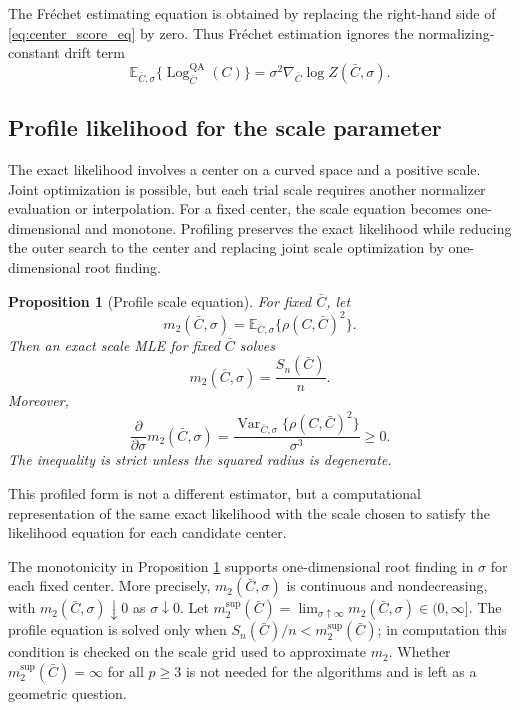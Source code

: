 \documentclass[
  12pt]{article}
\newcommand{\Frechet}{Fr\'{e}chet\xspace}
\newcommand{\Log}{\operatorname{Log}}
\newcommand{\E}{\mathbb E}
\newcommand{\Var}{\operatorname{Var}}
\newcommand{\QA}{\mathrm{QA}}
\newtheorem{proposition}{Proposition}
\begin{document}
The \Frechet estimating equation is obtained by replacing the right-hand side of \eqref{eq:center_score_eq} by zero. Thus Fr\'echet estimation ignores the normalizing-constant drift term
\[
\E_{\bar C,\sigma}\{\Log^{\QA}_{\bar C}(C)\}=\sigma^2\nabla_{\bar C}\log Z(\bar C,\sigma).
\]



\subsection{Profile likelihood for the scale parameter}

The exact likelihood involves a center on a curved space and a positive scale. Joint optimization is possible, but each trial scale requires another normalizer evaluation or interpolation. For a fixed center, the scale equation becomes one-dimensional and monotone. Profiling preserves the exact likelihood while reducing the outer search to the center and replacing joint scale optimization by one-dimensional root finding.

\begin{proposition}[Profile scale equation]\label{prop:profile_scale}
For fixed $\bar C$, let
\[
m_2(\bar C,\sigma)=\E_{\bar C,\sigma}\{\rho(C,\bar C)^2\}.
\]
Then an exact scale MLE for fixed $\bar C$ solves
\[
m_2(\bar C,\sigma)=\frac{S_n(\bar C)}{n}.
\]
Moreover,
\begin{equation}\label{eq:m2_monotone}
\frac{\partial}{\partial\sigma}m_2(\bar C,\sigma)=\frac{\Var_{\bar C,\sigma}\{\rho(C,\bar C)^2\}}{\sigma^3}\ge0.
\end{equation}
The inequality is strict unless the squared radius is degenerate.
\end{proposition}

This profiled form is not a different estimator, but a computational representation of the same exact likelihood with the scale chosen to satisfy the likelihood equation for each candidate center.

The monotonicity in Proposition \ref{prop:profile_scale} supports one-dimensional root finding in $\sigma$ for each fixed center. More precisely, $m_2(\bar C,\sigma)$ is continuous and nondecreasing, with $m_2(\bar C,\sigma)\downarrow0$ as $\sigma\downarrow0$. Let $m_2^{\sup}(\bar C)=\lim_{\sigma\uparrow\infty}m_2(\bar C,\sigma)\in(0,\infty]$. The profile equation is solved only when $S_n(\bar C)/n<m_2^{\sup}(\bar C)$; in computation this condition is checked on the scale grid used to approximate $m_2$. Whether $m_2^{\sup}(\bar C)=\infty$ for all $p\ge3$ is not needed for the algorithms and is left as a geometric question.
\end{document}
